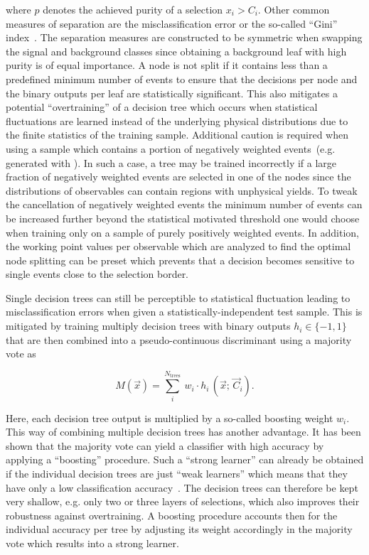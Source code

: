 where $p$ denotes the achieved purity of a selection $x_{i}>C_{i}$. Other common measures of separation are the misclassification error or the so-called ``Gini'' index~\cite{Gini}. The separation measures are constructed to be symmetric when swapping the signal and background classes since obtaining a background leaf with high purity is of equal importance. A node is not split if it contains less than a predefined minimum number of events to ensure that the decisions per node and the binary outputs per leaf are statistically significant. This also mitigates a potential ``overtraining'' of a decision tree which occurs when statistical fluctuations are learned instead of the underlying physical distributions due to the finite statistics of the training sample. Additional caution is required when using a sample which contains a portion of negatively weighted events~(e.g. generated with \MGAMC). In such a case, a tree may be trained incorrectly if a large fraction of negatively weighted events are selected in one of the nodes since the distributions of observables can contain regions with unphysical yields. To tweak the cancellation of negatively weighted events the minimum number of events can be increased further beyond the statistical motivated threshold one would choose when training only on a sample of purely positively weighted events. In addition, the working point values per observable which are analyzed to find the optimal node splitting can be preset which prevents that a decision becomes sensitive to single events close to the selection border.

Single decision trees can still be perceptible to statistical fluctuation leading to misclassification errors when given a statistically-independent test sample. This is mitigated by training multiply decision trees with binary outputs $h_{i}\in\{-1,1\}$ that are then combined into a pseudo-continuous discriminant using a majority vote as

\begin{equation}
M(\vec{x})=\sum_{i}^{N_\mathrm{trees}}~w_{i}\cdot h_{i}\,(\vec{x};\,\vec{C}_{i}).\label{eq:technique-majority-vote}
\end{equation}

Here, each decision tree output is multiplied by a so-called boosting weight $w_{i}$. This way of combining multiple decision trees has another advantage. It has been shown that the majority vote can yield a classifier with high accuracy by applying a ``boosting'' procedure. Such a ``strong learner'' can already be obtained if the individual decision trees are just ``weak learners'' which means that they have only a low classification accuracy~\cite{Schapire1990,FREUND1995256}. The decision trees can therefore be kept very shallow, e.g. only two or three layers of selections, which also improves their robustness against overtraining. A boosting procedure accounts then for the individual accuracy per tree by adjusting its weight accordingly in the majority vote which results into a strong learner.

